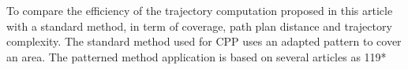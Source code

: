 
  To compare the efficiency of the trajectory computation proposed in this article with a standard method, in term of coverage, path plan distance and trajectory complexity. The standard method used for CPP uses an adapted pattern to cover an area. The patterned method application is based on several articles as \citep{144*torres2016,191*di2016,63*chao2008,66*galceran2013} 119* %

